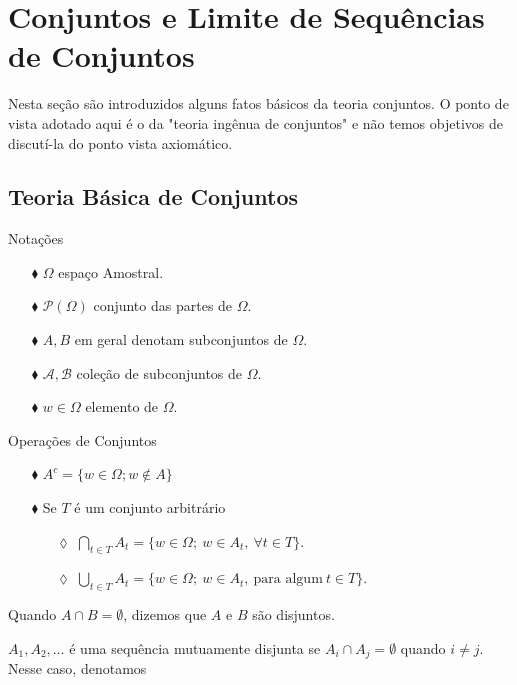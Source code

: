 \chapter[Aula 1]{Conjuntos e Limite de Sequências de Conjuntos}
\chaptermark{}

Nesta seção são introduzidos alguns fatos básicos da teoria
conjuntos. O ponto de vista adotado aqui é o da "teoria ingênua
de conjuntos" e não temos objetivos de discutí-la do ponto 
vista axiomático.

  
\section{Teoria Básica de Conjuntos}
Notações

\begin{enumerate}
\item[$\blacklozenge$] $\Omega$ espaço Amostral.
\item[$\blacklozenge$] $\mathcal{P}(\Omega)$ conjunto das partes de $\Omega$.
\item[$\blacklozenge$] $A,B$ em geral denotam subconjuntos de $\Omega$.
\item[$\blacklozenge$] $\mathcal{A}, \mathcal{B}$ coleção de subconjuntos de $\Omega$.
\item[$\blacklozenge$] $w \in \Omega$ elemento de $\Omega$.
\end{enumerate}


Operações de Conjuntos


\begin{enumerate}
\item[$\blacklozenge$] $A^{c}= \{w \in \Omega; w \notin A\}$
\item[$\blacklozenge$] Se $T$ é um conjunto arbitrário
	\begin{enumerate}
	\item[$\lozenge$]  $\displaystyle\bigcap_{t \in T}{A_t}
							= 
						\{ w \in \Omega;\ w \in A_t,\ \forall t \in T\}$.
	\item[$\lozenge$]  $\displaystyle\bigcup_{t \in T}{A_t}
							= 
						\{ w \in \Omega;\ w \in A_t,\ \text{para algum}\ t \in T \}$.
	\end{enumerate}
\end{enumerate}

Quando $A \cap B = \emptyset$, dizemos que $A$ e $B$ são disjuntos.

$A_1, A_2,\ldots$ é uma sequência mutuamente disjunta se $A_i \cap A_j = \emptyset$ 
quando $i \neq j$. Nesse caso, denotamos

